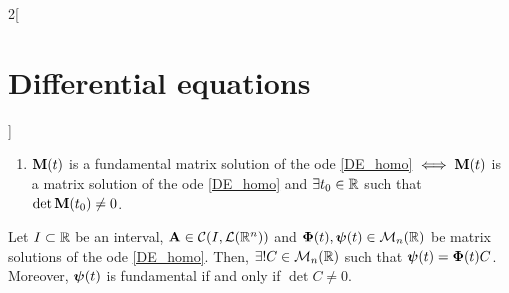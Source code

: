 \documentclass[../../../main.tex]{subfiles}
\begin{document}
\begin{multicols}{2}[\section{Differential equations}]
\begin{prop}
\begin{enumerate}
      \item $\boldsymbol{\mathrm{M}}(t)$ is a fundamental matrix solution of the ode \eqref{DE_homo} $\iff\boldsymbol{\mathrm{M}}(t)$ is a matrix solution of the ode \eqref{DE_homo} and $\exists t_0\in\mathbb{R}$ such that $\det\boldsymbol{\mathrm{M}}(t_0)\ne 0$.
    \end{enumerate}
  \end{prop}
  \begin{prop}
    Let $I\subset \mathbb{R}$ be an interval, $\boldsymbol{\mathrm{A}}\in\mathcal{C}(I,\mathcal{L}(\mathbb{R}^n))$ and $\boldsymbol{\mathrm{\Phi}}(t),\boldsymbol{\mathrm{\psi}}(t)\in\mathcal{M}_n(\mathbb{R})$ be matrix solutions of the ode \eqref{DE_homo}. Then, $\exists! C\in\mathcal{M}_n(\mathbb{R})$ such that $\boldsymbol{\mathrm{\psi}}(t)=\boldsymbol{\mathrm{\Phi}}(t)C$. Moreover, $\boldsymbol{\mathrm{\psi}}(t)$ is fundamental if and only if $\det C\ne 0$.
  \end{prop}

\end{multicols}
\end{document}
